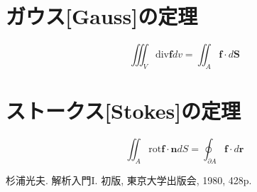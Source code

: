 \documentclass[a4paper,10pt,report]{amsart}
\theoremstyle{plain}
\theoremstyle{definition}
\theoremstyle{remark}
\begin{document}
    \section{ガウス[Gauss]の定理}
    \begin{equation}
        \iiint_{V}\mathrm{div}\bm{f}dv=\iint_{A}\bm{f}\cdot d\bm{S}
    \end{equation}
    \section{ストークス[Stokes]の定理}
    \begin{equation}
        \iint_{A}\mathrm{rot}\bm{f}\cdot\bm{n}dS=\oint_{\partial A}\bm{f}\cdot d\bm{r}
    \end{equation}
    \begin{thebibliography}{9}
        杉浦光夫. 解析入門I. 初版, 東京大学出版会, 1980, 428p.
    \end{thebibliography}
    
\end{document}
